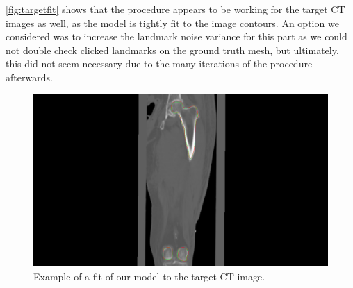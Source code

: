 \autoref{fig:targetfit} shows that the procedure appears to be working for the target CT images as well, as the model is tightly fit to the image contours. An option we considered was to increase the landmark noise variance for this part as we could not double check clicked landmarks on the ground truth mesh, but ultimately, this did not seem necessary due to the many iterations of the procedure afterwards.

\begin{figure}
	\centering
  \includegraphics[width=\columnwidth]{./Figures/local_minimum_y-axis}
  \caption{
    Example of a fit of our model to the target CT image. }
  \label{fig:targetfit}
\end{figure}




